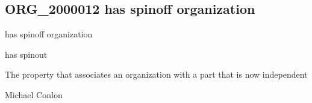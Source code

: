 \documentclass[letterpaper,10pt,english]{sphinxmanual}
\begin{document}
\subsection{ORG\_2000012 \sphinxhyphen{} has spin\sphinxhyphen{}off organization}
\label{\detokenize{doc-ORG_2000012:org-2000012-has-spin-off-organization}}\label{\detokenize{doc-ORG_2000012:index-0}}\label{\detokenize{doc-ORG_2000012::doc}}
\begin{sphinxShadowBox}

\sphinxAtStartPar
has spin\sphinxhyphen{}off organization
\end{sphinxShadowBox}

\begin{sphinxShadowBox}

\sphinxAtStartPar
has spinout
\end{sphinxShadowBox}

\begin{sphinxShadowBox}

\sphinxAtStartPar
{}
\end{sphinxShadowBox}

\begin{sphinxShadowBox}

\sphinxAtStartPar
The property that associates an organization with a part that is now independent
\end{sphinxShadowBox}

\begin{sphinxShadowBox}

\sphinxAtStartPar
Michael Conlon 
\end{sphinxShadowBox}

\begin{sphinxShadowBox}

\sphinxAtStartPar
{\hyperref[\detokenize{doc-ORG_0000001::doc}]{}}
\end{sphinxShadowBox}

\begin{sphinxShadowBox}

\sphinxAtStartPar
{\hyperref[\detokenize{doc-ORG_0000001::doc}]{}}
\end{sphinxShadowBox}
\end{document}
